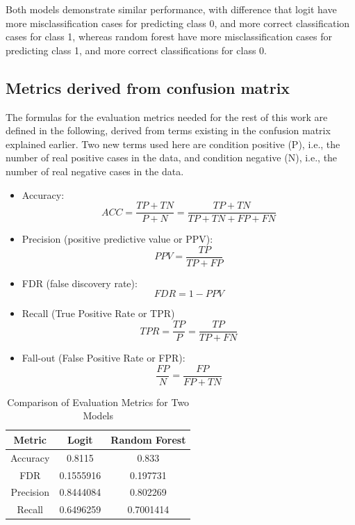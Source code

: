 \documentclass{article}
\providecommand{\tightlist}{%
  \setlength{\itemsep}{0pt}\setlength{\parskip}{0pt}}
\begin{document}
Both models demonstrate similar performance, with difference that logit
have more misclassification cases for predicting class 0, and more
correct classification cases for class 1, whereas random forest have
more misclassification cases for predicting class 1, and more correct
classifications for class 0.

\hypertarget{metrics-derived-from-confusion-matrix}{%
\subsection{Metrics derived from confusion
matrix}\label{metrics-derived-from-confusion-matrix}}

The formulas for the evaluation metrics needed for the rest of this work
are defined in the following, derived from terms existing in the
confusion matrix explained earlier. Two new terms used here are
condition positive (P), i.e., the number of real positive cases in the
data, and condition negative (N), i.e., the number of real negative
cases in the data.

\begin{itemize}
\tightlist
\item
  Accuracy:
  \[ACC = \frac{TP + TN}{P + N} = \frac{TP + TN}{TP + TN + FP + FN}\]
\item
  Precision (positive predictive value or PPV):
  \[PPV = \frac{TP}{TP + FP}\]
\item
  FDR (false discovery rate): \[FDR = 1 - PPV\]
\item
  Recall (True Positive Rate or TPR)
  \[TPR = \frac{TP}{P} = \frac{TP}{TP + FN}\]
\item
  Fall-out (False Positive Rate or FPR):
  \[\frac{FP}{N} = \frac{FP}{FP + TN}\]
\end{itemize}

\begin{table}[h]
\centering
\begin{tabular}{|c|c|c|}
\hline
\textbf{Metric} & \textbf{Logit} & \textbf{Random Forest} \\
\hline
Accuracy & 0.8115 & 0.833 \\
FDR & 0.1555916 & 0.197731 \\
Precision & 0.8444084 & 0.802269 \\
Recall & 0.6496259 & 0.7001414 \\
\hline
\end{tabular}
\caption{Comparison of Evaluation Metrics for Two Models}
\label{tab:comparison}
\end{table}
\end{document}
